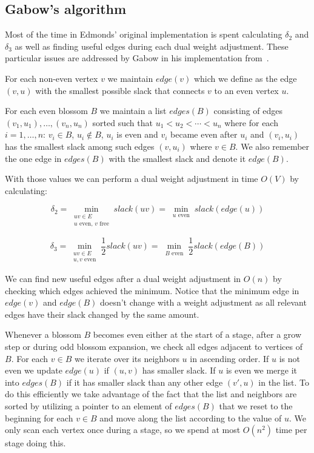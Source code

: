 \subsection{Gabow's algorithm}

Most of the time in Edmonds' original implementation is spent calculating $\delta_2$ and $\delta_3$ as well as finding useful edges during each dual weight adjustment. These particular issues are addressed by Gabow in his implementation from~\cite{gabow1974implementation}.

For each non-even vertex $v$ we maintain $edge(v)$ which we define as the edge $(v, u)$ with the smallest possible slack that connects $v$ to an even vertex $u$.

For each even blossom $B$ we maintain a list $edges(B)$ consisting of edges $(v_1, u_1), \dots, (v_n, u_n)$ sorted such that $u_1 < u_2 < \cdots < u_n$ where for each $i = 1, \dots, n$: $v_i \in B$, $u_i \notin B$, $u_i$ is even and $v_i$ became even after $u_i$ and $(v_i, u_i)$ has the smallest slack among such edges $(v, u_i)$ where $v \in B$. We also remember the one edge in $edges(B)$ with the smallest slack and denote it $edge(B)$.

With those values we can perform a dual weight adjustment in time $O(V)$ by calculating:

\[\delta_2=\min_{\substack{uv\in E \\ \text{$u$ even, $v$ free}}} slack(uv) = \min_{\substack{u \text{ even}}} slack(edge(u))\] 

\[\delta_3=\min_{\substack{uv\in E \\ \text{$u, v$ even}}} \frac{1}{2}slack(uv) = \min_{\substack{B \text{ even}}} \frac{1}{2}slack(edge(B))\] 

We can find new useful edges after a dual weight adjustment in $O(n)$ by checking which edges achieved the minimum. Notice that the minimum edge in $edge(v)$ and $edge(B)$ doesn't change with a weight adjustment as all relevant edges have their slack changed by the same amount.

Whenever a blossom $B$ becomes even either at the start of a stage, after a grow step or during odd blossom expansion, we check all edges adjacent to vertices of $B$. For each $v \in B$ we iterate over its neighbors $u$ in ascending order. If $u$ is not even we update $edge(u)$ if $(u, v)$ has smaller slack. If $u$ is even we merge it into $edges(B)$ if it has smaller slack than any other edge $(v', u)$ in the list. To do this efficiently we take advantage of the fact that the list and neighbors are sorted by utilizing a pointer to an element of $edges(B)$ that we reset to the beginning for each $v \in B$ and move along the list according to the value of $u$. We only scan each vertex once during a stage, so we spend at most $O(n^2)$ time per stage doing this.

